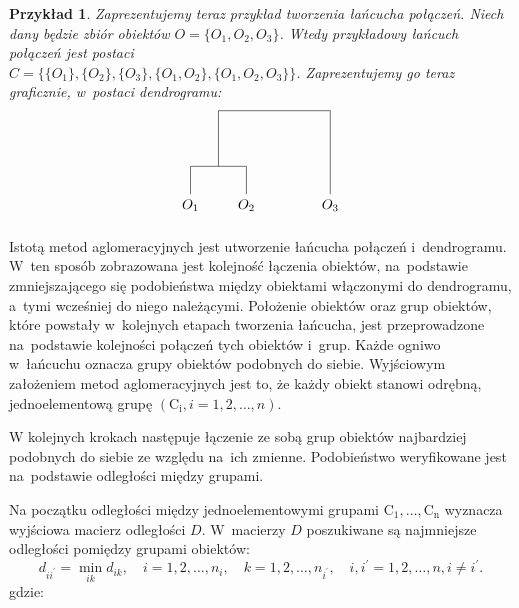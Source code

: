 \documentclass[12pt,a4paper]{report}
\newtheorem{example}{Przykład}
\begin{document}
\begin{example}
Zaprezentujemy teraz przykład tworzenia łańcucha połączeń. Niech dany będzie zbiór obiektów $O=\{O_1, O_2, O_3\}$. Wtedy przykładowy łańcuch połączeń jest postaci \\
$C=\{ \{O_1\}, \{O_2\}, \{O_3\}, \{O_1, O_2\}, \{O_1, O_2, O_3\} \}$. Zaprezentujemy go teraz graficznie, w~postaci dendrogramu: 
$$
\begin{tikzpicture}[scale=.7]
  \node (1) at (0.0,-0.40) {$O_{1}$};
  \node (2) at (2.0,-0.40) {$O_{2}$};
  \node (3) at (5,-0.40) {$O_{3}$}; 
   \draw (0,0)--(0,1); 
   \draw (0,1)--(2,1);
   \draw (2,0)--(2,1);
   \draw (1,1)--(1,3);
   \draw (1,3)--(5,3);
   \draw (5,0)--(5,3);
\end{tikzpicture}
$$ 
\end{example}



Istotą metod aglomeracyjnych jest utworzenie łańcucha połączeń i~dendrogramu. W~ten sposób zobrazowana jest kolejność łączenia obiektów, na~podstawie zmniejszającego się podobieństwa między obiektami włączonymi do dendrogramu, a~tymi wcześniej do niego należącymi. Położenie obiektów oraz grup obiektów, które powstały w~kolejnych etapach tworzenia łańcucha, jest przeprowadzone na~podstawie kolejności połączeń tych obiektów i~grup. Każde ogniwo w~łańcuchu oznacza grupy obiektów podobnych do siebie. 
Wyjściowym założeniem metod aglomeracyjnych jest to, że każdy obiekt stanowi odrębną, jednoelementową grupę $(\mathrm{C_{i}}, i=1,2,\dots,n)$.

W kolejnych krokach następuje łączenie ze sobą grup obiektów najbardziej podobnych do siebie ze względu na~ich zmienne. Podobieństwo weryfikowane jest na~podstawie odległości między grupami.  %

Na początku odległości między jednoelementowymi grupami $\mathrm{C_{1}},\dots,\mathrm{C_{n}}$ wyznacza wyjściowa macierz odległości $D$. W~macierzy $D$ poszukiwane są najmniejsze odległości pomiędzy grupami obiektów:
$$
d_{ii^{'}}= \min\limits_{ik} {d_{ik}}, \quad i=1,2,\dots,n_{i}, \quad k=1,2,\dots,n_{i^{'}}, \quad i,i^{'}=1,2,\dots,n, i\neq i^{'}.
$$
gdzie:
\end{document}
